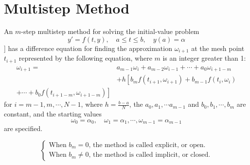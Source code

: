 \section{Multistep Method}
\begin{defn}
An $m$-step multistep method for solving the initial-value problem
\[
y'=f(t,y),\quad a\leq t\leq b,\quad y(a)=\alpha
\]]
has a difference equation for finding the approximation $\omega_{i+1}$ at the mesh point $t_{i+1}$ represented by the following equation, where $m$ is an integer greater than 1:
\begin{align*}
    \omega_{i+1} =& a_{m-1}\omega_{i}+a_{m-2}\omega_{i-1}+\cdots+a_{0}\omega_{i+1-m} \\
    & + h\left[b_{m}f(t_{i+1},\omega_{i+1})+b_{m-1}f(t_{i},\omega_{i})\right. \\
    \left.+\cdots+b_{0}f(t_{i+1-m},\omega_{i+1-m})\right]
\end{align*}
for $i=m-1,m,\cdots,N-1$, where $h=\frac{b-a}{N}$, the $a_0,a_1,\cdots a_{m-1}$ and $b_0,b_1,\cdots,b_m$ are constant, and the starting values
\[
\omega_{0}=\alpha_{0},\quad\omega_{1}=\alpha_{1},\cdots,\omega_{m-1}=\alpha_{m-1}
\]
are specified.

\begin{equation*}
    \begin{cases}
    \text{When $b_m=0$, the method is called explicit, or open.} \\
    \text{When $b_m\neq 0$, the method is called implicit, or closed.}
    \end{cases}
\end{equation*}
\end{defn}